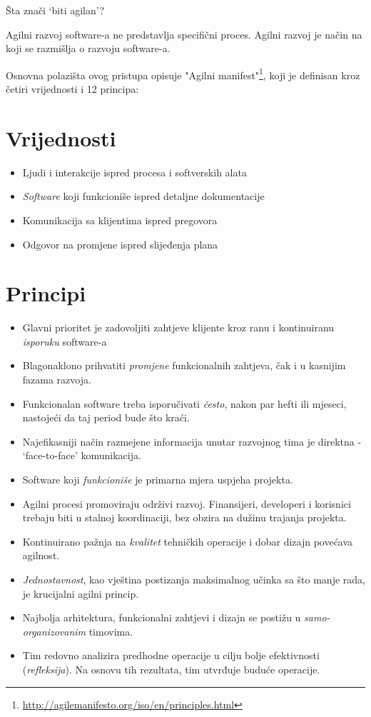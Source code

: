 \documentclass[lmodern, utf8, zavrsni]{fit}
\begin{document}
Šta znači `biti agilan'?

Agilni razvoj software-a ne predstavlja specifični proces. Agilni razvoj je način na koji se razmišlja o razvoju software-a\citep[str. 9]{agileart}.

Osnovna polazišta ovog pristupa opisuje "Agilni manifest"\footnote{\url{http://agilemanifesto.org/iso/en/principles.html}}, koji je definisan kroz četiri vrijednosti i 12 principa:

\section{Vrijednosti}

\begin{itemize}
\item Ljudi i interakcije ispred procesa i softverskih alata
\item \emph{Software} koji funkcioniše ispred detaljne dokumentacije
\item Komunikacija sa klijentima ispred pregovora
\item Odgovor na promjene ispred slijeđenja plana
\end{itemize}

\section{Principi}

\begin{itemize}
\item Glavni prioritet je zadovoljiti zahtjeve klijente kroz ranu i kontinuiranu \emph{isporuku} software-a
\item Blagonaklono prihvatiti \emph{promjene} funkcionalnih zahtjeva, čak i u kasnijim fazama razvoja.
\item Funkcionalan software treba isporučivati \emph{često}, nakon par hefti ili mjeseci, nastojeći da taj period bude što kraći.
\item Najefikasniji način razmejene informacija unutar razvojnog tima je direktna - `face-to-face' komunikacija.
\item Software koji \emph{funkcioniše} je primarna mjera uspjeha projekta.
\item Agilni procesi promoviraju održivi razvoj. Finansijeri, developeri i korisnici trebaju biti u stalnoj koordinaciji, bez obzira na dužinu trajanja projekta.
\item Kontinuirano pažnja na \emph{kvalitet} tehničkih operacije i dobar dizajn povećava agilnost.
\item \emph{Jednostavnost}, kao vještina postizanja maksimalnog učinka sa što manje rada, je krucijalni agilni princip.
\item Najbolja arhitektura, funkcionalni zahtjevi i dizajn se postižu u \emph{samo-organizovanim} timovima.
\item Tim redovno analizira predhodne operacije u cilju bolje efektivnosti (\emph{refleksija}). Na osnovu tih rezultata, tim utvrđuje buduće operacije.
\end{itemize}
\end{document}
